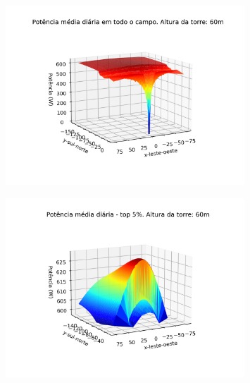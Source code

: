 \documentclass[12pt,notheorems,hyperref={pdfauthor= Rafael Nardi}]{beamer}
\begin{document}
\begin{frame}%
	\begin{figure}[htpb]
		\centering
		\includegraphics[width=0.8\textwidth]{../../plots/tower_shadow_correction/square_grid_along_day_60mfull_grid.png}
		\label{fig:heliost_field_average_60m_top5}
	\end{figure}
\end{frame}

\begin{frame}%
	\begin{figure}[htpb]
		\centering
		\includegraphics[width=0.8\textwidth]{../../plots/tower_shadow_correction/square_grid_along_day_60mtop_5_most_powerfull.png}
		\label{fig:heliost_field_average_60m}
	\end{figure}
\end{frame}
\end{document}
